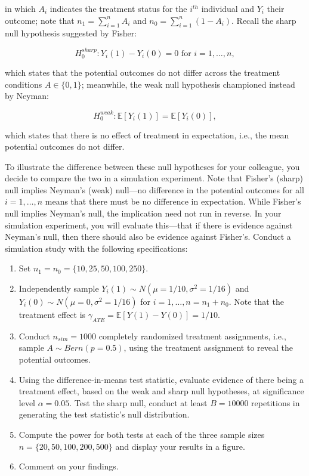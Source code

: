 \documentclass[
  letterpaper,
  DIV=11,
  numbers=noendperiod]{scrartcl}
\providecommand{\tightlist}{%
  \setlength{\itemsep}{0pt}\setlength{\parskip}{0pt}}\usepackage{longtable,booktabs,array}
\begin{document}
in which \(A_i\) indicates the treatment status for the \(i^{th}\)
individual and \(Y_i\) their outcome; note that
\(n_1 = \sum_{i=1}^{n} A_i\) and \(n_0 = \sum_{i=1}^{n}(1 - A_i)\).
Recall the sharp null hypothesis suggested by Fisher:

\[
H_0^{sharp} : Y_i(1) - Y_i(0) = 0 \text{ for } i = 1, \ldots , n ,
\]

which states that the potential outcomes do not differ across the
treatment conditions \(A \in \{0,1\}\); meanwhile, the weak null
hypothesis championed instead by Neyman:

\[
H_0^{weak} : \mathbb{E}[Y_i(1)] = \mathbb{E}[Y_i(0)] ,
\]

which states that there is no effect of treatment in expectation, i.e.,
the mean potential outcomes do not differ.

To illustrate the difference between these null hypotheses for your
colleague, you decide to compare the two in a simulation experiment.
Note that Fisher's (sharp) null implies Neyman's (weak) null---no
difference in the potential outcomes for all \(i = 1, \ldots, n\) means
that there must be no difference in expectation. While Fisher's null
implies Neyman's null, the implication need not run in reverse. In your
simulation experiment, you will evaluate this---that if there is
evidence against Neyman's null, then there should also be evidence
against Fisher's. Conduct a simulation study with the following
specifications:

\begin{enumerate}
\def\labelenumi{\arabic{enumi}.}
\tightlist
\item
  Set \(n_1 = n_0 = \{10, 25, 50, 100, 250\}\).
\item
  Independently sample \(Y_i(1) \sim N(\mu = 1/10, \sigma^2 = 1/16)\)
  and \(Y_i(0) \sim N(\mu = 0, \sigma^2 = 1/16)\) for
  \(i = 1, \ldots, n = n_1 + n_0\). Note that the treatment effect is
  \(\gamma_{ATE} = \mathbb{E}[Y(1) - Y(0)] = 1/10\).
\item
  Conduct \(n_{sim} = 1000\) completely randomized treatment
  assignments, i.e., sample \(A \sim Bern(p = 0.5)\), using the
  treatment assignment to reveal the potential outcomes.
\item
  Using the difference-in-means test statistic, evaluate evidence of
  there being a treatment effect, based on the weak and sharp null
  hypotheses, at significance level \(\alpha = 0.05\). Test the sharp
  null, conduct at least \(B = 10000\) repetitions in generating the
  test statistic's null distribution.
\item
  Compute the power for both tests at each of the three sample sizes
  \(n = \{20, 50, 100, 200, 500\}\) and display your results in a
  figure.
\item
  Comment on your findings.
\end{enumerate}
\end{document}
